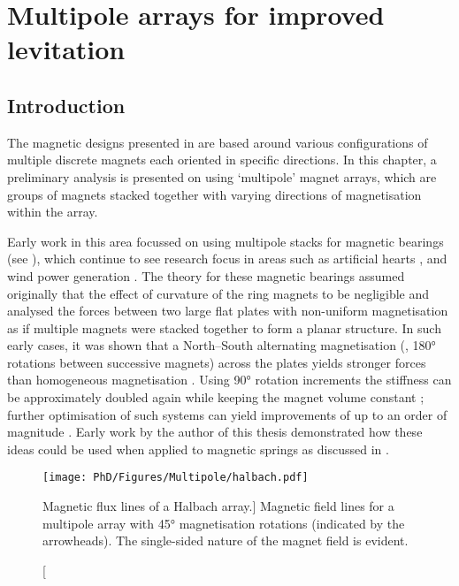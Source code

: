 \documentclass[11pt,a4paper]{memoir}
\begin{document}
\chapter{Multipole arrays for improved levitation}


\section{Introduction}

The magnetic designs presented in  are based around various configurations of multiple discrete magnets each oriented in specific directions.
In this chapter, a preliminary analysis is presented on using `multipole' magnet arrays, which are groups of magnets stacked together with varying directions of magnetisation within the array.

Early work in this area focussed on using multipole stacks for magnetic bearings (see ), which continue to see research focus in areas such as artificial hearts \parencite{chen2002,finocchiaro2008,samiappan2008}, and wind power generation \parencite{liu2008-ietm}.
The theory for these magnetic bearings assumed originally that the effect of curvature of the ring magnets to be negligible and analysed the forces between two large flat plates with non-uniform magnetisation as if multiple magnets were stacked together to form a planar structure.
In such early cases, it was shown that a North--South alternating magnetisation (\ie, \ang{180} rotations between successive magnets) across the plates yields stronger forces than homogeneous magnetisation \cite{backers1961}.
Using \ang{90} rotation increments the stiffness can be approximately doubled again while keeping the magnet volume constant \cite{yonnet1991}; further optimisation of such systems can yield improvements of up to an order of magnitude \cite{moser2006}.
Early work by the author of this thesis demonstrated how these ideas could be used when applied to magnetic springs as discussed in  \cite{robertson2005-ietm}.

\begin{figure}
\texttt{[image: PhD/Figures/Multipole/halbach.pdf]}
\caption
  [Magnetic flux lines of a Halbach array.]
  {
    Magnetic field lines for a multipole array with \ang{45} magnetisation rotations (indicated by the arrowheads).
    The single-sided nature of the magnet field is evident.
  }
\end{figure}
\end{document}
